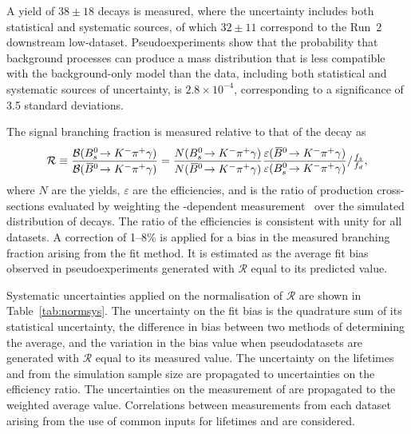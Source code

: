 A yield of \mbox{$38\pm18$} \bskpig decays is measured, where the uncertainty includes both statistical and systematic sources, of which \mbox{$32\pm11$} correspond to the Run~2 downstream low-\mkpi dataset.
Pseudoexperiments show that the probability that background processes can produce a mass distribution that is less compatible with the background-only model than the data, including both statistical and systematic sources of uncertainty, is \mbox{$2.8\times10^{-4}$}, corresponding to a significance of 3.5 standard deviations.

The signal branching fraction is measured relative to that of the \bdkpig decay as
\begin{equation*}
\mathcal{R} \equiv \frac{\BF(\bskpig)}{\BF(\bdkpig)} = \frac{N(\bskpig)}{N(\bdkpig)} \frac{\varepsilon(\bdkpig)}{\varepsilon(\bskpig)} / \fsfd,
\end{equation*}
where $N$ are the yields, $\varepsilon$ are the efficiencies, and \fsfd is the ratio of production cross-sections evaluated by weighting the \pt-dependent measurement~\cite{LHCb-PAPER-2020-046} over the simulated \pt distribution of \bdkpig decays.
The ratio of the efficiencies is consistent with unity for all datasets.
A correction of 1--8\% is applied for a bias in the measured branching fraction arising from the fit method. It is estimated as the average fit bias observed in pseudoexperiments generated with $\mathcal{R}$ equal to its predicted value.

Systematic uncertainties applied on the normalisation of $\mathcal{R}$ are shown in Table~\ref{tab:normsys}.
The uncertainty on the fit bias is the quadrature sum of its statistical uncertainty, the difference in bias between two methods of determining the average, and the variation in the bias value when pseudodatasets are generated with $\mathcal{R}$ equal to its measured value.
The uncertainty on the \BdorBs lifetimes~\cite{HFLAV23} and from the simulation sample size are propagated to uncertainties on the efficiency ratio.
The uncertainties on the measurement of \fsfd are propagated to the weighted average value.
Correlations between measurements from each dataset arising from the use of common inputs for \BdorBs lifetimes and \fsfd are considered.

